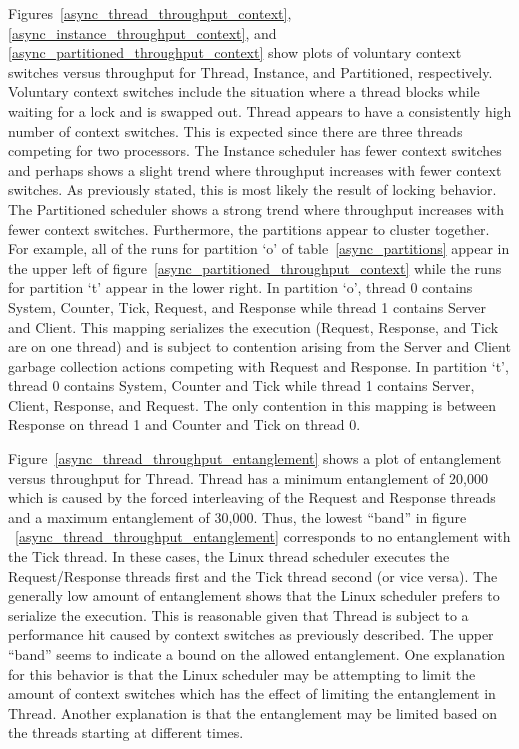 Figures~\ref{async_thread_throughput_context}, \ref{async_instance_throughput_context}, and \ref{async_partitioned_throughput_context} show plots of voluntary context switches versus throughput for Thread, Instance, and Partitioned, respectively.
Voluntary context switches include the situation where a thread blocks while waiting for a lock and is swapped out.
Thread appears to have a consistently high number of context switches.
This is expected since there are three threads competing for two processors.
The Instance scheduler has fewer context switches and perhaps shows a slight trend where throughput increases with fewer context switches.
As previously stated, this is most likely the result of locking behavior.
The Partitioned scheduler shows a strong trend where throughput increases with fewer context switches.
Furthermore, the partitions appear to cluster together.
For example, all of the runs for partition `o' of table~\ref{async_partitions} appear in the upper left of figure~\ref{async_partitioned_throughput_context} while the runs for partition `t' appear in the lower right.
In partition `o', thread 0 contains System, Counter, Tick, Request, and Response while thread 1 contains Server and Client.
This mapping serializes the execution (Request, Response, and Tick are on one thread) and is subject to contention arising from the Server and Client garbage collection actions competing with Request and Response.
In partition `t', thread 0 contains System, Counter and Tick while thread 1 contains Server, Client, Response, and Request.
The only contention in this mapping is between Response on thread 1 and Counter and Tick on thread 0.

Figure~\ref{async_thread_throughput_entanglement} shows a plot of entanglement versus throughput for Thread.
Thread has a minimum entanglement of 20,000 which is caused by the forced interleaving of the Request and Response threads and a maximum entanglement of 30,000.
Thus, the lowest ``band'' in figure ~\ref{async_thread_throughput_entanglement} corresponds to no entanglement with the Tick thread.
In these cases, the Linux thread scheduler executes the Request/Response threads first and the Tick thread second (or vice versa).
The generally low amount of entanglement shows that the Linux scheduler prefers to serialize the execution.
This is reasonable given that Thread is subject to a performance hit caused by context switches as previously described.
The upper ``band'' seems to indicate a bound on the allowed entanglement.
One explanation for this behavior is that the Linux scheduler may be attempting to limit the amount of context switches which has the effect of limiting the entanglement in Thread.
Another explanation is that the entanglement may be limited based on the threads starting at different times.

